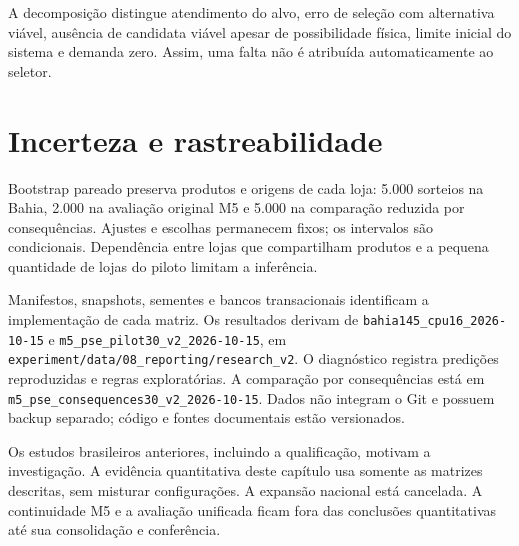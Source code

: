 A decomposição distingue atendimento do alvo, erro de seleção com alternativa viável, ausência de candidata viável apesar de possibilidade física, limite inicial do sistema e demanda zero. Assim, uma falta não é atribuída automaticamente ao seletor.

\section{Incerteza e rastreabilidade}
\label{sec:protocolo_exp}\label{sec:reporting}\label{app:reproducibility}
Bootstrap pareado preserva produtos e origens de cada loja: 5.000 sorteios na Bahia, 2.000 na avaliação original M5 e 5.000 na comparação reduzida por consequências. Ajustes e escolhas permanecem fixos; os intervalos são condicionais. Dependência entre lojas que compartilham produtos e a pequena quantidade de lojas do piloto limitam a inferência.

Manifestos, snapshots, sementes e bancos transacionais identificam a implementação de cada matriz. Os resultados derivam de \nolinkurl{bahia145_cpu16_2026-10-15} e \nolinkurl{m5_pse_pilot30_v2_2026-10-15}, em \nolinkurl{experiment/data/08_reporting/research_v2}. O diagnóstico registra predições reproduzidas e regras exploratórias. A comparação por consequências está em \nolinkurl{m5_pse_consequences30_v2_2026-10-15}. Dados não integram o Git e possuem backup separado; código e fontes documentais estão versionados.

Os estudos brasileiros anteriores, incluindo a qualificação, motivam a investigação. A evidência quantitativa deste capítulo usa somente as matrizes descritas, sem misturar configurações. A expansão nacional está cancelada. A continuidade M5 e a avaliação unificada ficam fora das conclusões quantitativas até sua consolidação e conferência.

